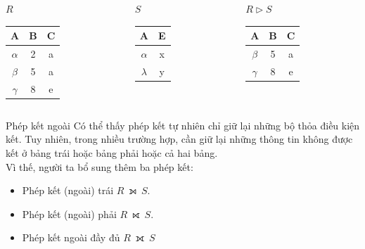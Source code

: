 \documentclass[11pt, handout]{beamer}
\begin{document}
  \begin{frame}
    \begin{columns}[T]
      \begin{column}{0.3\textwidth}
        \centering $R$
        \medskip \\
        \begin{tabular}{|c|c|c|}
          \hline
          \textbf{A} & \textbf{B} & \textbf{C}  \\[0.5ex] \hline\hline
          $\alpha$ & 2 & a\\ \hline
          $\beta$ & 5 & a\\ \hline
          $\gamma$ & 8 & e\\ \hline
        \end{tabular}
      \end{column}
      \begin{column}{0.3\textwidth}
        \centering $S$
        \medskip \\
        \begin{tabular}{|c|c|}
          \hline
          \textbf{A} & \textbf{E} \\[0.5ex] \hline\hline
          $\alpha$ & x\\ \hline
          $\lambda$ & y\\ \hline
        \end{tabular}
      \end{column}
      \begin{column}{0.3\textwidth}
        \centering $R \rhd S$
        \medskip \\
        \begin{tabular}{|c|c|c|}
          \hline
          \textbf{A} & \textbf{B} & \textbf{C}\\[0.5ex] \hline\hline
          $\beta$ & 5 & a\\ \hline
          $\gamma$ & 8 & e\\ \hline
        \end{tabular}
      \end{column}
    \end{columns}
  \end{frame}
  \begin{frame}{Phép kết ngoài}
    Có thể thấy phép kết tự nhiên chỉ giữ lại những bộ thỏa điều kiện kết.
    Tuy nhiên, trong nhiều trường hợp, cần giữ lại những thông tin không được kết 
    ở bảng trái hoặc bảng phải hoặc cả hai bảng. \\
    Vì thế, người ta bổ sung thêm ba phép kết:
    \begin{itemize}
      \item Phép kết (ngoài) trái $R~⟕~S$.
      \item Phép kết (ngoài) phải $R~⟖~S$.
      \item Phép kết ngoài đầy đủ $R~⟗~S$
    \end{itemize}
  \end{frame}
\end{document}
